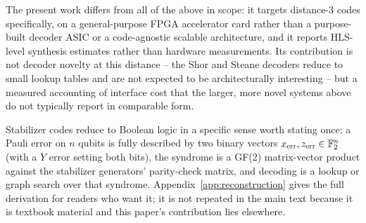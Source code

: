 The present work differs from all of the above in scope: it targets distance-3 codes specifically, on a general-purpose FPGA accelerator card rather than a purpose-built decoder ASIC or a code-agnostic scalable architecture, and it reports HLS-level synthesis estimates rather than hardware measurements. Its contribution is not decoder novelty at this distance -- the Shor and Steane decoders reduce to small lookup tables and are not expected to be architecturally interesting -- but a measured accounting of interface cost that the larger, more novel systems above do not typically report in comparable form.

Stabilizer codes reduce to Boolean logic in a specific sense worth stating once: a Pauli error on \(n\) qubits is fully described by two binary vectors \(x_{\rm err}, z_{\rm err} \in \mathbb{F}_2^n\) (with a \(Y\) error setting both bits), the syndrome is a GF(2) matrix-vector product against the stabilizer generators' parity-check matrix, and decoding is a lookup or graph search over that syndrome. Appendix~\ref{app:reconstruction} gives the full derivation for readers who want it; it is not repeated in the main text because it is textbook material and this paper's contribution lies elsewhere.
